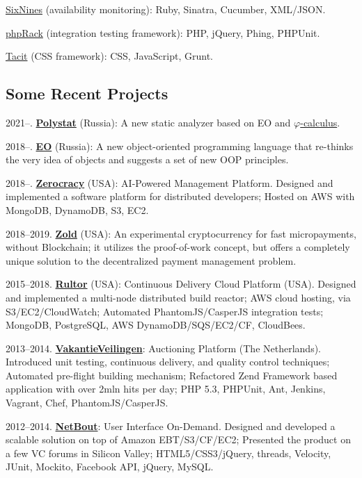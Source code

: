 \documentclass{yb}
\begin{document}
\href{https://www.sixnines.io}{SixNines} (availability monitoring):
Ruby, Sinatra, Cucumber, XML/JSON.

\href{https://www.phprack.com}{phpRack} (integration testing framework):
PHP, jQuery, Phing, PHPUnit.

\href{https://github.com/yegor256/tacit}{Tacit} (CSS framework):
CSS, JavaScript, Grunt.

\subsection*{Some Recent Projects}

2021--. \href{https://www.polystat.org}{\textbf{Polystat}} (Russia): A new static
analyzer based on EO and \href{https://arxiv.org/abs/2111.13384}{$\varphi$-calculus}.

2018--. \href{https://www.eolang.org}{\textbf{EO}} (Russia): A new object-oriented
programming language that re-thinks the very idea of objects
and suggests a set of new OOP principles.

2018--. \href{https://www.zerocracy.com}{\textbf{Zerocracy}} (USA): AI-Powered Management Platform.
Designed and implemented a software platform for distributed developers;
Hosted on AWS with MongoDB, DynamoDB, S3, EC2.

2018--2019. \href{https://www.zold.io}{\textbf{Zold}} (USA): An experimental cryptocurrency for
fast micropayments, without Blockchain; it utilizes the proof-of-work
concept, but offers a completely unique solution to the decentralized
payment management problem.

2015--2018. \href{https://www.rultor.com}{\textbf{Rultor}} (USA): Continuous Delivery Cloud Platform (USA).
Designed and implemented a multi-node distributed build reactor;
AWS cloud hosting, via S3/EC2/CloudWatch;
Automated PhantomJS/CasperJS integration tests;
MongoDB, PostgreSQL, AWS DynamoDB/SQS/EC2/CF, CloudBees.

2013--2014. \href{https://www.VakantieVeilingen.nl}{\textbf{VakantieVeilingen}}: Auctioning Platform (The Netherlands).
Introduced unit testing, continuous delivery, and quality control techniques;
Automated pre-flight building mechanism;
Refactored Zend Framework based application with over 2mln hits per day;
PHP 5.3, PHPUnit, Ant, Jenkins, Vagrant, Chef, PhantomJS/CasperJS.

2012--2014. \href{https://www.netbout.com}{\textbf{NetBout}}: User Interface On-Demand.
Designed and developed a scalable solution on top of Amazon EBT/S3/CF/EC2;
Presented the product on a few VC forums in Silicon Valley;
HTML5/CSS3/jQuery, threads, Velocity, JUnit, Mockito, Facebook API, jQuery, MySQL.
\end{document}
